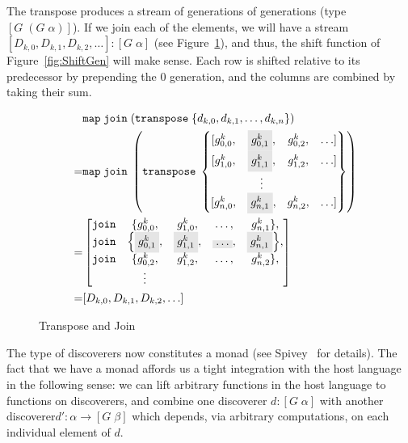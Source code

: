 The transpose produces a stream of generations of generations (type $[G\;(G\;\alpha)]$). If we join each of the elements, we will have a stream $[D_{k,0}, D_{k,1}, D_{k,2}, \ldots] : [G\;\alpha]$ (see Figure~\ref{fig:Transpose}), and thus, the shift function of Figure~\ref{fig:ShiftGen} will make sense. Each row is shifted relative to its predecessor by prepending the 0 generation, and the columns are combined by taking their sum.

\begin{figure}
  \begin{align*}
    &\code{map}\;\code{join}\;(\code{transpose}\;\{d_{k,0}, d_{k,1}, \ldots, d_{k,n}\})\\
  = &\code{map}\;\code{join}\;\left(\code{transpose}\;\left\{\begin{matrix}
        [g^k_{0,0}, & \colorbox{gray}{$g^k_{0,1}$}, & g^k_{0,2}, &\ldots]\\
        [g^k_{1,0}, & \colorbox{gray}{$g^k_{1,1}$}, & g^k_{1,2}, &\ldots]\\
                  & \vdots\\
        [g^k_{n,0}, & \colorbox{gray}{$g^k_{n,1}$}, & g^k_{n,2}, &\ldots]
      \end{matrix}\right\}\right)\\
      = &\left[\begin{matrix}
        \code{join}&\{g^k_{0,0}, & g^k_{1,0}, &\ldots, & g^k_{n,1}\},\\
        \code{join}&\Big\{\colorbox{gray}{$g^k_{0,1}$}, & \colorbox{gray}{$g^k_{1,1}$}, &\colorbox{gray}{$\ldots$}, & \colorbox{gray}{$g^k_{n,1}$}\Big\},\\
        \code{join}&\{g^k_{0,2}, & g^k_{1,2}, &\ldots, & g^k_{n,2}\},\\
                   & \vdots
                 \end{matrix}\right]\\
      \quad= &[D_{k,0}, D_{k,1}, D_{k,2}, \ldots]
  \end{align*}
\caption{Transpose and Join}
\label{fig:Transpose}
\end{figure}

The type of discoverers now constitutes a monad (see Spivey~\cite{SearchAlgebras} for details). The fact that we have a monad affords us a tight integration with the host language in the following sense: we can lift arbitrary functions in the host language to functions on discoverers, and combine one discoverer $d : [G\;\alpha]$ with another discoverer\linebreak $d' : \alpha \rightarrow [G\;\beta]$ which depends, via arbitrary computations, on each individual element of $d$. 

